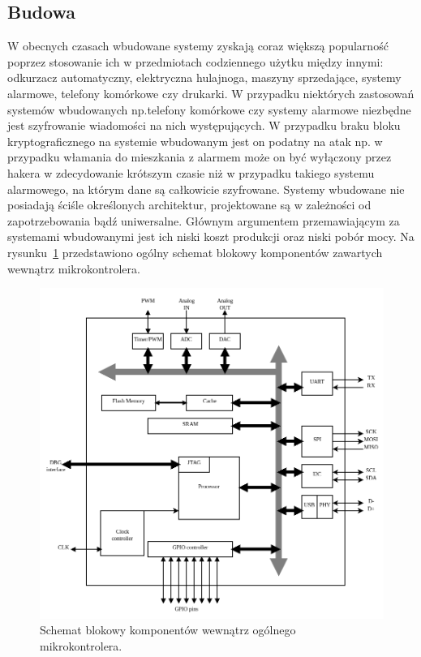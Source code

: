\documentclass[12p]{article}
\begin{document}
\subsection{Budowa }
\quad W obecnych czasach wbudowane systemy zyskają coraz większą popularność poprzez stosowanie ich w przedmiotach codziennego użytku między innymi: odkurzacz automatyczny, elektryczna hulajnoga, maszyny sprzedające, systemy alarmowe, telefony komórkowe czy drukarki. W przypadku niektórych zastosowań systemów wbudowanych np.telefony komórkowe czy systemy alarmowe niezbędne jest szyfrowanie wiadomości na nich występujących. W przypadku braku bloku kryptograficznego na systemie wbudowanym jest on podatny na atak np. w przypadku włamania do mieszkania z alarmem może on być wyłączony przez hakera w zdecydowanie krótszym czasie niż w przypadku takiego systemu alarmowego, na którym dane są całkowicie szyfrowane. Systemy wbudowane nie posiadają ściśle określonych architektur, projektowane są w zależności od zapotrzebowania bądź uniwersalne. Głównym argumentem przemawiającym za systemami wbudowanymi jest ich niski koszt produkcji oraz niski pobór mocy. Na rysunku~\ref{es} przedstawiono ogólny schemat blokowy komponentów zawartych wewnątrz mikrokontrolera.
\begin{figure}[H]
\centering
\includegraphics[width=15cm]{es.png}
\caption{Schemat blokowy komponentów wewnątrz ogólnego mikrokontrolera.~\cite{es}}\label{es}
\end{figure}
\end{document}
